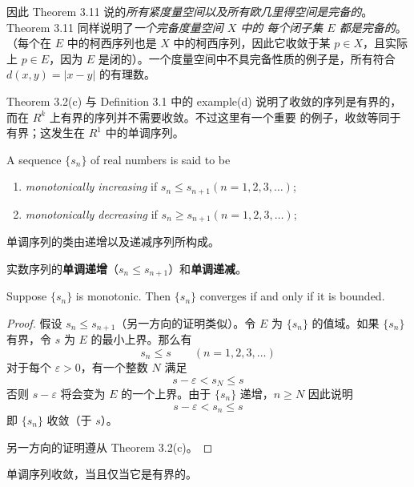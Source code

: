 \documentclass[../poma-notes.tex]{subfiles}
\begin{document}
因此 Theorem 3.11 说的\textit{所有紧度量空间以及所有欧几里得空间是完备的}。Theorem 3.11 同样说明了\textit{一个完备度量空间 $X$ 中的
  每个闭子集 $E$ 都是完备的}。（每个在 $E$ 中的柯西序列也是 $X$ 中的柯西序列，因此它收敛于某 $p \in X$，且实际上 $p \in E$，因为 $E$
是闭的）。一个度量空间中不具完备性质的例子是，所有符合 $d(x,y) = |x - y|$ 的有理数。

Theorem 3.2(c) 与 Definition 3.1 中的 example(d) 说明了收敛的序列是有界的，而在 $R^k$ 上有界的序列并不需要收敛。不过这里有一个重要
的例子，收敛等同于有界；这发生在 $R^1$ 中的单调序列。

\begin{definition}
  A sequence $\{s_n\}$ of real numbers is said to be
  \begin{enumerate}[label=(\alph*)]
    \item \textit{monotonically increasing} if $s_n \le s_{n+1} (n=1,2,3,\dots)$;
    \item \textit{monotonically decreasing} if $s_n \ge s_{n+1} (n=1,2,3,\dots)$;
  \end{enumerate}
\end{definition}

单调序列的类由递增以及递减序列所构成。

\anote 实数序列的\textbf{单调递增}（$s_n \le s_{n+1}$）和\textbf{单调递减}。


\begin{theorem}
  Suppose $\{s_n\}$ is monotonic. Then $\{s_n\}$ converges if and only if it is bounded.
\end{theorem}

\begin{proof}
  假设 $s_n \le s_{n+1}$（另一方向的证明类似）。令 $E$ 为 $\{s_n\}$ 的值域。如果 $\{s_n\}$ 有界，令 $s$ 为 $E$ 的最小上界。那么有
  \[ s_n \le s \qquad (n=1,2,3,\dots) \]
  对于每个 $\varepsilon > 0$，有一个整数 $N$ 满足
  \[ s - \varepsilon < s_N \le s \]
  否则 $s - \varepsilon$ 将会变为 $E$ 的一个上界。由于 $\{s_n\}$ 递增，$n \ge N$ 因此说明
  \[ s - \varepsilon < s_n \le s \]
  即 $\{s_n\}$ 收敛（于 $s$）。

  另一方向的证明遵从 Theorem 3.2(c)。
\end{proof}

\anote 单调序列收敛，当且仅当它是有界的。
\end{document}
